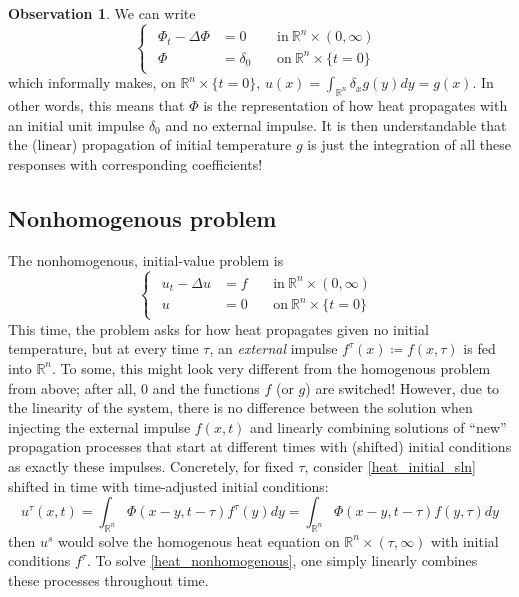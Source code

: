 \documentclass[openany, amssymb, psamsfonts]{amsart}
\theoremstyle{definition}
\newtheorem{obs}{Observation}[section]
\numberwithin{equation}{section}
\newcommand{\bbr}{\mathbb{R}}
\begin{document}
\begin{obs}
We can write 
\begin{equation}
\begin{cases}
    \begin{aligned}
        \Phi_t - \Delta \Phi &= 0 && \:\text{in}\: \bbr^n \times (0, \infty)\\
        \Phi &= \delta_0 &&\:\text{on}\: \bbr^n \times \{t = 0\} 
    \end{aligned}
\end{cases}
\end{equation}
which informally makes, on $\bbr^n \times \{t = 0\}$, $u(x) = \int_{\bbr^n} \delta_x g(y) dy = g(x)$. In other words, this means that $\Phi$ is the representation of how heat propagates with an initial unit impulse  $\delta_0$ and no external impulse. It is then understandable that the (linear) propagation of initial temperature $g$ is just the integration of all these responses with corresponding coefficients!
\end{obs}

\subsection{Nonhomogenous problem}
The nonhomogenous, initial-value problem is 
\begin{equation} \label{heat_nonhomogenous}
    \begin{cases}
        \begin{aligned}
            u_t - \Delta u &= f && \:\text{in}\: \bbr^n \times (0, \infty) \\
            u &= 0 && \:\text{on}\: \bbr^n \times \{t = 0\}
        \end{aligned}
    \end{cases}
\end{equation}
This time, the problem asks for how heat propagates given no initial temperature, but at every time $\tau$, an \textit{external} impulse $f^\tau(x) \coloneqq f(x, \tau)$ is fed into $\bbr^n$. To some, this might look very different from the homogenous problem from above; after all, $0$ and the functions $f$ (or $g$) are switched! However, due to the linearity of the system, there is no difference between the solution when injecting the external impulse $f(x, t)$ and linearly combining solutions of ``new'' propagation processes that start at different times with (shifted) initial conditions as exactly these impulses. Concretely, for fixed $\tau$, consider \eqref{heat_initial_sln} shifted in time with time-adjusted initial conditions:
\begin{equation}
u^\tau(x, t) = \int_{\bbr^n} \Phi(x-y, t-\tau) f^\tau(y) dy  = \int_{\bbr^n} \Phi(x-y, t-\tau) f(y, \tau) dy
\end{equation}
then $u^s$ would solve the homogenous heat equation on $\bbr^n \times (\tau, \infty)$ with initial conditions $f^\tau$. To solve \eqref{heat_nonhomogenous}, one simply linearly combines these processes throughout time.
\end{document}
